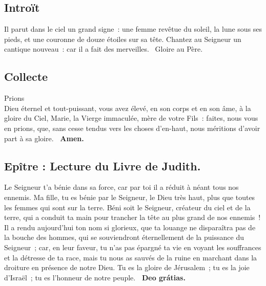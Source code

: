 


\clearpage
\begin{multicols}{2}
\subsection*{Introït}
Il parut dans le ciel un grand signe : une femme revêtue du soleil, la lune sous ses pieds, et une couronne de douze étoiles sur sa tête.
Chantez au Seigneur un cantique nouveau : car il a fait des merveilles.
\vb\ Gloire au Père.

\subsection*{Collecte}
Prions\\
Dieu éternel et tout-puissant, vous avez élevé, en son corps et en son âme, à la gloire du Ciel, Marie, la Vierge immaculée, mère de votre Fils : faites, nous vous en prions, que, sans cesse tendus vers les choses d’en-haut, nous méritions d’avoir part à sa gloire.
{\textbf {\rb\ Amen.}}

\subsection*{Epître : Lecture du Livre de Judith.}
Le Seigneur t’a bénie dans sa force, car par toi il a réduit à néant tous nos ennemis. Ma fille, tu es bénie par le Seigneur, le Dieu très haut, plus que toutes les femmes qui sont sur la terre. Béni soit le Seigneur, créateur du ciel et de la terre, qui a conduit ta main pour trancher la tête au plus grand de nos ennemis ! Il a rendu aujourd’hui ton nom si glorieux, que ta louange ne disparaîtra pas de la bouche des hommes, qui se souviendront éternellement de la puissance du Seigneur ; car, en leur faveur, tu n’as pas épargné ta vie en voyant les souffrances et la détresse de ta race, mais tu nous as sauvés de la ruine en marchant dans la droiture en présence de notre Dieu. Tu es la gloire de Jérusalem ; tu es la joie d’Israël ; tu es l’honneur de notre peuple.
\textbf{\rb\ Deo grátias.}


\end{multicols}
